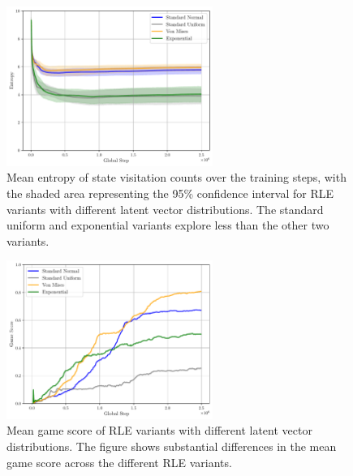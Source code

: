 \begin{figure}[h!]
  \centering
  \includegraphics[width=0.6\textwidth]{figures/gridworld_mean_entropy_state_visitation_distributions.pdf}
  \caption{Mean entropy of state visitation counts over the training steps, with the shaded area representing the 95\% confidence interval for RLE variants with different latent vector distributions. The standard uniform and exponential variants explore less than the other two variants.}
  \label{fig:gridworld-entropy-distributions}
\end{figure}

\begin{figure}[h!]
  \centering
  \includegraphics[width=0.6\textwidth]{figures/gridworld_mean_game_score_distributions.pdf}
  \caption{Mean game score of RLE variants with different latent vector distributions. The figure shows substantial differences in the mean game score across the different RLE variants.}
  \label{fig:gridworld-score-distributions}
\end{figure}

